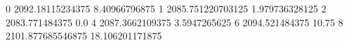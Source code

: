 0 2092.18115234375 8.40966796875
1 2085.751220703125 1.979736328125
2 2083.771484375 0.0
4 2087.3662109375 3.5947265625
6 2094.521484375 10.75
8 2101.877685546875 18.106201171875
